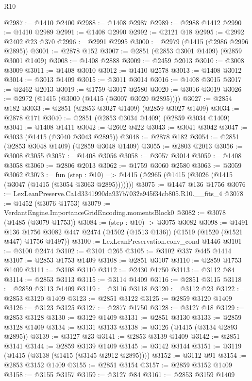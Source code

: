 \begin{lexlean}{R10}
\begin{coremodule}
@2987 := @1410 @2400
@2988 := @1408 @2987
@2989 := @2988 @1412
@2990 := @1410 @2989
@2991 := @1408 @2990
@2992 := @2121 @18
@2995 := @2992 @2402 @23 @370
@2996 := @2991 @2995
@3000 := @2979 (@1415 (@2986 @2996 @2895))
@3001 := @2878 @152
@3007 := @2851 (@2853 @3001 @1409) (@2859 @3001 @1409)
@3008 := @1408 @2888
@3009 := @2459 @2013
@3010 := @3008 @3009
@3011 := @1408 @3010
@3012 := @1410 @2578
@3013 := @1408 @3012
@3014 := @3013 @1409
@3015 := @3011 @3014
@3016 := @1408 @3015
@3017 := @2462 @2013
@3019 := @1759 @3017 @2580
@3020 := @3016 @3019
@3026 := @2972 (@1415 (@3000 (@1415 (@3007 @3020 @2895))))
@3027 := @2854 @182
@3033 := @2851 (@2853 @3027 @1409) (@2859 @3027 @1409)
@3034 := @2878 @171
@3040 := @2851 (@2853 @3034 @1409) (@2859 @3034 @1409)
@3041 := @1408 @1411
@3042 := @2602 @422
@3043 := @3041 @3042
@3047 := @3033 (@1415 (@3040 @3043 @2895))
@3048 := @2878 @182
@3054 := @2851 (@2853 @3048 @1409) (@2859 @3048 @1409)
@3055 := @2803 @2013
@3056 := @3008 @3055
@3057 := @1408 @3056
@3058 := @3057 @3014
@3059 := @1408 @3058
@3060 := @2806 @2013
@3062 := @1759 @3060 @2580
@3063 := @3059 @3062
@3073 := fun (step : @10) =>
  @1415 (@2965 (@1415 (@3026 (@1415 (@3047 (@1415 (@3054 @3063 @2895)))))))
@3075 := @1447 @136 @1756
@3076 := LexLeanPreserve.Ca1d3341990da937b7032e945f34cb805.R10.__fits_4
@3078 := @1452 (@3076 @1753)
@3079 := VerdantEngine.ImportanceGridEncoding.momentsBlock0
@3082 := @3078 (@1485 (@3079 @1753))
@3084 := (step : @10) -> @3075 @3082
@3098 := @1491
    @136
    @1756
    @3082
    @447
    @2474
    (@1502 (@1513 @136))
    (@1519 (@1520 (@1521 @447) @1756 @1497))
@3100 := LexLeanPreservation.conv_cond @1446
@3101 := @3100 @2474
@3102 := @3101 @265
@3105 := @3102 @337 @445 @1414
@3107 := @2853 @1753 @1409
@3108 := @2851 @3107
@3110 := @2859 @1753 @1409
@3111 := @3108 @3110
@3112 := @2430 @1750
@3113 := @3112 @84
@3114 := @2853 @3113
@3115 := @3114 @1409
@3116 := @2851 @3115
@3118 := @2859 @3113 @1409
@3119 := @3116 @3118
@3120 := @3112 @23
@3122 := @2853 @3120 @1409
@3123 := @2851 @3122
@3125 := @2859 @3120 @1409
@3126 := @3123 @3125
@3127 := @2877 @1750
@3128 := @3127 @18
@3129 := @2853 @3128
@3130 := @3129 @1409
@3131 := @2851 @3130
@3133 := @2859 @3128 @1409
@3134 := @3131 @3133
@3138 := @3126 (@1415 (@3134 @2893 @2895))
@3139 := @3127 @23
@3141 := @2853 @3139 @1409
@3142 := @2851 @3141
@3144 := @2859 @3139 @1409
@3145 := @3142 @3144
@3151 := @3119 (@1415 (@3138 (@1415 (@3145 @2912 @2895))))
@3152 := @3112 @91
@3154 := @2853 @3152 @1409
@3155 := @2851 @3154
@3157 := @2859 @3152 @1409
@3158 := @3155 @3157
@3159 := @3127 @84
@3161 := @2853 @3159 @1409

\end{coremodule}
\end{lexlean}
